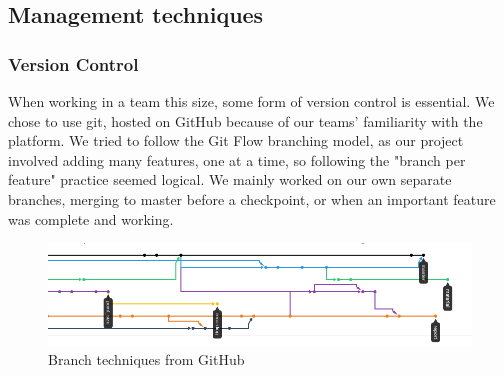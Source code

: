 \documentclass{article}
\begin{document}
\subsection{Management techniques}
\subsubsection{Version Control}
When working in a team this size, some form of version control is essential. We chose to use git, hosted on GitHub because of our teams' familiarity with the platform. We tried to follow the Git Flow branching model, as our project involved adding many features, one at a time, so following the "branch per feature" practice seemed logical. We mainly worked on our own separate branches, merging to master before a checkpoint, or when an important feature was complete and working. 
\begin{figure}[h]
  \centering
  \includegraphics[scale=0.5]{github}
  \caption{Branch techniques from GitHub}
  \label{fig:github}
\end{figure}
\\
\end{document}
